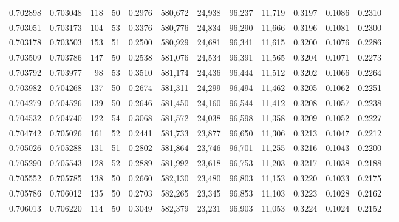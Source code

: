 \begin{tabular}{rrrrrrrrrrrrr}
0.702898 & 0.703048 &   118 &  50 &                                     0.2976 & 580,672 &  24,938 &  96,237 &  11,719 & 0.3197 & 0.1086 & 0.2310 \\
0.703051 & 0.703173 &   104 &  53 &                                     0.3376 & 580,776 &  24,834 &  96,290 &  11,666 & 0.3196 & 0.1081 & 0.2300 \\
0.703178 & 0.703503 &   153 &  51 &                                     0.2500 & 580,929 &  24,681 &  96,341 &  11,615 & 0.3200 & 0.1076 & 0.2286 \\
0.703509 & 0.703786 &   147 &  50 &                                     0.2538 & 581,076 &  24,534 &  96,391 &  11,565 & 0.3204 & 0.1071 & 0.2273 \\
0.703792 & 0.703977 &    98 &  53 &                                     0.3510 & 581,174 &  24,436 &  96,444 &  11,512 & 0.3202 & 0.1066 & 0.2264 \\
0.703982 & 0.704268 &   137 &  50 &                                     0.2674 & 581,311 &  24,299 &  96,494 &  11,462 & 0.3205 & 0.1062 & 0.2251 \\
0.704279 & 0.704526 &   139 &  50 &                                     0.2646 & 581,450 &  24,160 &  96,544 &  11,412 & 0.3208 & 0.1057 & 0.2238 \\
0.704532 & 0.704740 &   122 &  54 &                                     0.3068 & 581,572 &  24,038 &  96,598 &  11,358 & 0.3209 & 0.1052 & 0.2227 \\
0.704742 & 0.705026 &   161 &  52 &                                     0.2441 & 581,733 &  23,877 &  96,650 &  11,306 & 0.3213 & 0.1047 & 0.2212 \\
0.705026 & 0.705288 &   131 &  51 &                                     0.2802 & 581,864 &  23,746 &  96,701 &  11,255 & 0.3216 & 0.1043 & 0.2200 \\
0.705290 & 0.705543 &   128 &  52 &                                     0.2889 & 581,992 &  23,618 &  96,753 &  11,203 & 0.3217 & 0.1038 & 0.2188 \\
0.705552 & 0.705785 &   138 &  50 &                                     0.2660 & 582,130 &  23,480 &  96,803 &  11,153 & 0.3220 & 0.1033 & 0.2175 \\
0.705786 & 0.706012 &   135 &  50 &                                     0.2703 & 582,265 &  23,345 &  96,853 &  11,103 & 0.3223 & 0.1028 & 0.2162 \\
0.706013 & 0.706220 &   114 &  50 &                                     0.3049 & 582,379 &  23,231 &  96,903 &  11,053 & 0.3224 & 0.1024 & 0.2152 \\

\end{tabular}
